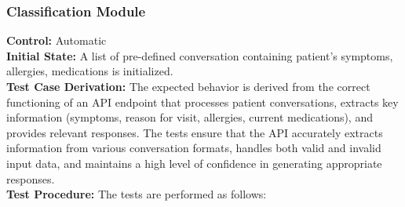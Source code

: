 \documentclass[12pt, titlepage]{article}
\begin{document}
  \subsubsection{Classification Module}

  \textbf{Control:} Automatic\\
  \textbf{Initial State:} A list of pre-defined conversation containing patient's symptoms, allergies, medications is initialized.\\
  \textbf{Test Case Derivation:} The expected behavior is derived from the correct functioning of an API endpoint that processes patient conversations, extracts key information (symptoms, reason for visit, allergies, current medications), and provides relevant responses. The tests ensure that the API accurately extracts information from various conversation formats, handles both valid and invalid input data, and maintains a high level of confidence in generating appropriate responses.\\
  \textbf{Test Procedure:} The tests are performed as follows:\\
\end{document}
